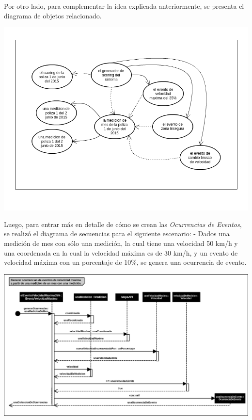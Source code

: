 \newpage

Por otro lado, para complementar la idea explicada anteriormente, se presenta el diagrama
de objetos relacionado.


\centerline{\includegraphics[width=1\textwidth]{./imagenes/objetos_general.png}}


Luego, para entrar más en detalle de cómo se crean las \textit{Ocurrencias de Eventos},
se realizó el diagrama de secuencias para el siguiente escenario:
\newline
- Dados una medición de mes con sólo una medición, la cual tiene una velocidad 50 km/h y una
coordenada en la cual la velocidad máxima es de 30 km/h, y un evento de velocidad máxima con 
un porcentaje de 10\%, se genera una ocurrencia de evento.
\newline


\centerline{\includegraphics[width=1\textwidth]{./imagenes/secuencias_velmax.png}}


